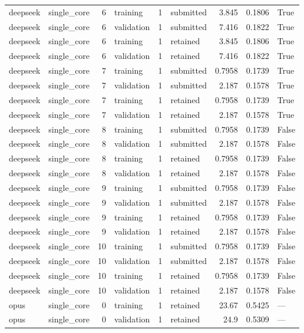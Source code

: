 \begin{tabular}{llrlrlrrl}
deepseek & single\_core & 6 & training & 1 & submitted & 3.845 & 0.1806 & True \\
deepseek & single\_core & 6 & validation & 1 & submitted & 7.416 & 0.1822 & True \\
deepseek & single\_core & 6 & training & 1 & retained & 3.845 & 0.1806 & True \\
deepseek & single\_core & 6 & validation & 1 & retained & 7.416 & 0.1822 & True \\
deepseek & single\_core & 7 & training & 1 & submitted & 0.7958 & 0.1739 & True \\
deepseek & single\_core & 7 & validation & 1 & submitted & 2.187 & 0.1578 & True \\
deepseek & single\_core & 7 & training & 1 & retained & 0.7958 & 0.1739 & True \\
deepseek & single\_core & 7 & validation & 1 & retained & 2.187 & 0.1578 & True \\
deepseek & single\_core & 8 & training & 1 & submitted & 0.7958 & 0.1739 & False \\
deepseek & single\_core & 8 & validation & 1 & submitted & 2.187 & 0.1578 & False \\
deepseek & single\_core & 8 & training & 1 & retained & 0.7958 & 0.1739 & False \\
deepseek & single\_core & 8 & validation & 1 & retained & 2.187 & 0.1578 & False \\
deepseek & single\_core & 9 & training & 1 & submitted & 0.7958 & 0.1739 & False \\
deepseek & single\_core & 9 & validation & 1 & submitted & 2.187 & 0.1578 & False \\
deepseek & single\_core & 9 & training & 1 & retained & 0.7958 & 0.1739 & False \\
deepseek & single\_core & 9 & validation & 1 & retained & 2.187 & 0.1578 & False \\
deepseek & single\_core & 10 & training & 1 & submitted & 0.7958 & 0.1739 & False \\
deepseek & single\_core & 10 & validation & 1 & submitted & 2.187 & 0.1578 & False \\
deepseek & single\_core & 10 & training & 1 & retained & 0.7958 & 0.1739 & False \\
deepseek & single\_core & 10 & validation & 1 & retained & 2.187 & 0.1578 & False \\
opus & single\_core & 0 & training & 1 & retained & 23.67 & 0.5425 & — \\
opus & single\_core & 0 & validation & 1 & retained & 24.9 & 0.5309 & — \\

\end{tabular}
